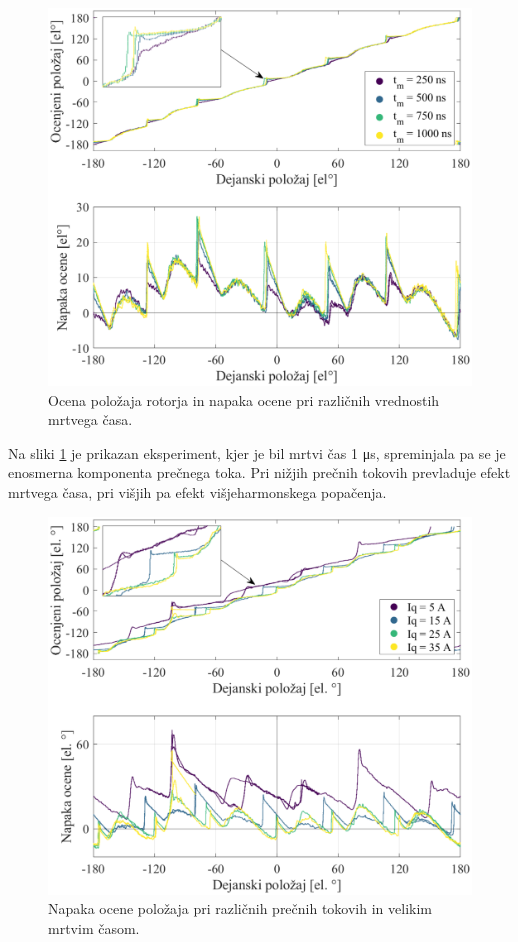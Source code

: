 \documentclass[a4paper,twoside,openright,12pt,slovene]{book}
\begin{document}
\begin{figure}[!htbp]
    \centering
    \includegraphics[width=1.05\columnwidth]{Slike/vsiljenaPozicijaMrtviCasPlot_angleError.eps}
    \caption{\label{vsiljenaPozicijaMrtviCasPlot_angleError} Ocena položaja rotorja in napaka ocene pri različnih vrednostih mrtvega časa. }
\end{figure}

\newpage

Na sliki \ref{vsiljenaPozicijaMrtviCasPlot_angleError} je prikazan eksperiment, kjer je bil mrtvi čas 1 μs, spreminjala pa se je enosmerna komponenta prečnega toka. Pri nižjih prečnih tokovih
prevladuje efekt mrtvega časa, pri višjih pa efekt višjeharmonskega popačenja.

\begin{figure}[!htbp]
    \centering
    \includegraphics[width=1.05\columnwidth]{Slike/vsiljenaPozicijaTokoviZMrtvimCasom_angleError.eps}
    \caption{\label{vsiljenaPozicijaTokoviZMrtvimCasom_angleError} Napaka ocene položaja pri različnih prečnih tokovih in velikim mrtvim časom. }
\end{figure}
\end{document}
